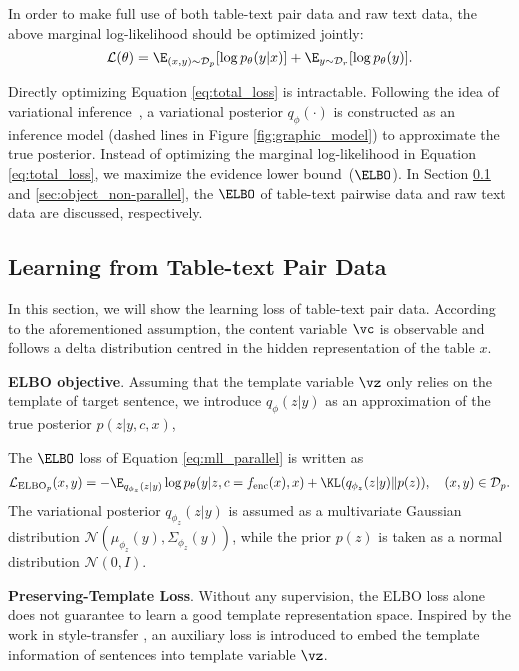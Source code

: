 In order to make full use of both table-text pair data and raw text data, the above marginal log-likelihood should be optimized jointly:
\begin{equation}
    \mathcal{L}(\theta) = \E_{(x,y)\sim \mathcal{D}_p} [\log p_\theta(y|x)] + \E_{y \sim \mathcal{D}_r} [\log p_\theta(y)].
    \label{eq:total_loss}
\end{equation}

Directly optimizing Equation \ref{eq:total_loss} is intractable. 
Following the idea of variational inference~\citep{kingma2013auto}, a variational posterior $q_\phi(\cdot)$ is constructed as an inference model (dashed lines in Figure \ref{fig:graphic_model}) to approximate the true posterior. Instead of optimizing the marginal log-likelihood in Equation \ref{eq:total_loss}, we maximize the evidence lower bound~($\ELBO$). In Section \ref{sec:object_parallel} and \ref{sec:object_non-parallel}, the $\ELBO$ of table-text pairwise data and raw text data are discussed, respectively.



\subsection{Learning from Table-text Pair Data}
\label{sec:object_parallel}
In this section, we will show the learning loss of table-text pair data. 
According to the aforementioned assumption, the content variable $\vc$ is observable and follows a delta distribution centred in the hidden representation of the table $x$. 




\noindent\textbf{ELBO objective}. \quad Assuming that the template variable $\vz$ only relies on the template of target sentence, we introduce $q_\phi(z|y)$ as an approximation of the true posterior $p(z|y,c,x)$,  


The $\ELBO$ loss of Equation \ref{eq:mll_parallel} is written as  
\begin{align*}
    \mathcal{L}_{\text{ELBO}_p}(x,y) =  - \E_{q_{\phi_z}(z|y)}\log p_\theta(y|z,c=f_{\text{enc}}(x),x) + \KL (q_{\phi_z}(z|y) \Vert p(z)), \quad (x,y) \in \mathcal{D}_p.
\end{align*}
The variational posterior $q_{\phi_z}(z|y)$ is assumed as a multivariate Gaussian distribution $\mathcal{N}(\mu_{\phi_z}(y), \Sigma_{\phi_z}(y))$, while the prior $p(z)$ is taken as a normal distribution $\mathcal{N}(0, I)$.

\noindent\textbf{Preserving-Template Loss}. \quad
Without any supervision, the ELBO loss alone does not guarantee to learn a good template representation space. Inspired by the work in style-transfer \citep{hzticml17_disent, disent_in_ST1, baoyu, disent_in_ST2_ACL19}, an auxiliary loss is introduced to embed the template information of sentences into template variable $\vz$.

